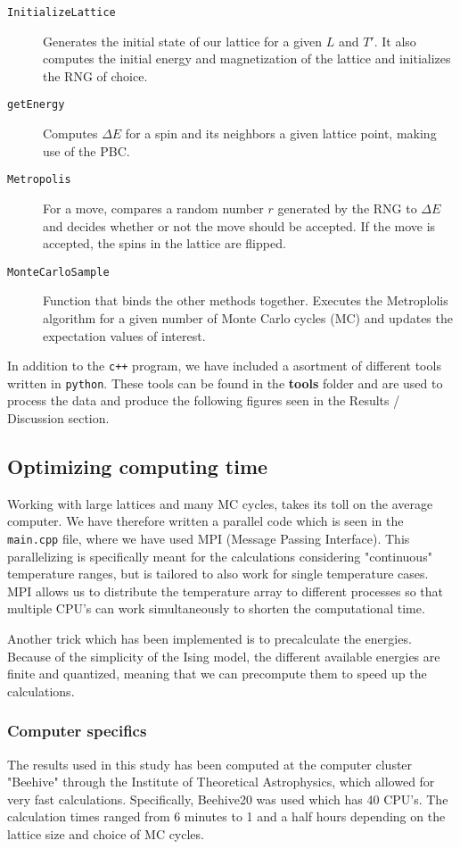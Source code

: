 \documentclass[a4paper, 10pt, reqno]{amsart}
\begin{document}
\begin{description}
    \item[\texttt{InitializeLattice}] Generates the initial state of our lattice for a given $L$ and $T'$. It also computes the initial energy and magnetization of the lattice and initializes the RNG of choice.  
    \item[\texttt{getEnergy}] Computes $\Delta E$ for a spin and its neighbors a given lattice point, making use of the PBC.
    \item[\texttt{Metropolis}] For a move, compares a random number $r$ generated by the RNG to $\Delta E$ and decides whether or not the move should be accepted. If the move is accepted, the spins in the lattice are flipped.
    \item[\texttt{MonteCarloSample}] Function that binds the other methods together. Executes the Metroplolis algorithm for a given number of Monte Carlo cycles (MC) and updates the expectation values of interest.
\end{description}
In addition to the \texttt{c++} program, we have included a asortment of different tools written in \texttt{python}. These tools can be found in the \textbf{tools} folder and are used to process the data and produce the following figures seen in the Results / Discussion section.

\subsection{Optimizing computing time}
Working with large lattices and many MC cycles, takes its toll on the average computer. We have therefore written a parallel code which is seen in the \texttt{main.cpp} file, where we have used MPI (Message Passing Interface). This parallelizing is specifically meant for the calculations considering "continuous" temperature ranges, but is tailored to also work for single temperature cases. MPI allows us to distribute the temperature array to different processes so that multiple CPU's can work simultaneously to shorten the computational time.  

Another trick which has been implemented is to precalculate the energies. Because of the simplicity of the Ising model, the different available energies are finite and quantized, meaning that we can precompute them to speed up the calculations.

\subsubsection{Computer specifics}
The results used in this study has been computed at the computer cluster "Beehive" through the Institute of Theoretical Astrophysics, which allowed for very fast calculations. Specifically, Beehive20 was used which has 40 CPU's. The calculation times ranged from 6 minutes to 1 and a half hours depending on the lattice size and choice of MC cycles.
\end{document}
